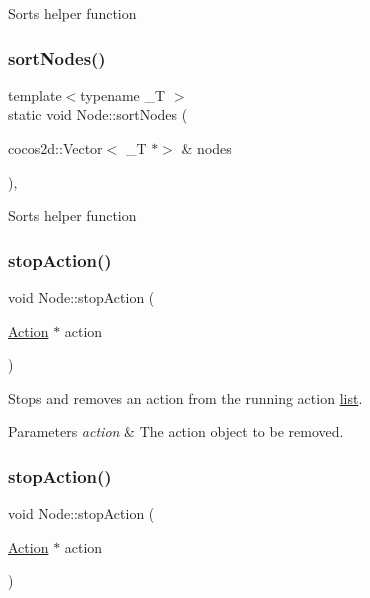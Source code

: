 Sorts helper function \mbox{\label{classNode_a17a2149cbfe0819a11f3e109cc67645c}} 
\subsubsection{\texorpdfstring{sort\+Nodes()}{sortNodes()}\hspace{0.1cm}{\footnotesize\ttfamily [2/2]}}
{\footnotesize\ttfamily template$<$typename \+\_\+T $>$ \\
static void Node\+::sort\+Nodes (\begin{DoxyParamCaption}\item[{cocos2d\+::\+Vector$<$ \+\_\+T $\ast$$>$ \&}]{nodes }\end{DoxyParamCaption})\hspace{0.3cm}{\ttfamily [inline]}, {\ttfamily [static]}}

Sorts helper function \mbox{\label{classNode_a7f07a11c8550f7be6b6215b56ab69723}} 
\subsubsection{\texorpdfstring{stop\+Action()}{stopAction()}\hspace{0.1cm}{\footnotesize\ttfamily [1/2]}}
{\footnotesize\ttfamily void Node\+::stop\+Action (\begin{DoxyParamCaption}\item[{\hyperlink{classAction}{Action} $\ast$}]{action }\end{DoxyParamCaption})}

Stops and removes an action from the running action \hyperlink{protocollist-p}{list}.


\begin{DoxyParams}{Parameters}
{\em action} & The action object to be removed. \\
\hline
\end{DoxyParams}
\mbox{\label{classNode_a7f07a11c8550f7be6b6215b56ab69723}} 
\subsubsection{\texorpdfstring{stop\+Action()}{stopAction()}\hspace{0.1cm}{\footnotesize\ttfamily [2/2]}}
{\footnotesize\ttfamily void Node\+::stop\+Action (\begin{DoxyParamCaption}\item[{\hyperlink{classAction}{Action} $\ast$}]{action }\end{DoxyParamCaption})}

